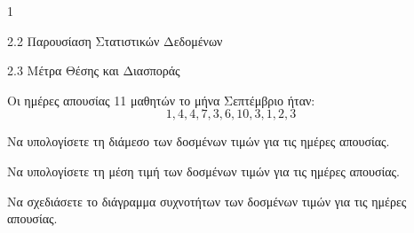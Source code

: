\begin{ylh}{1}
    \item 2.2 Παρουσίαση Στατιστικών Δεδομένων
    \item 2.3 Μέτρα Θέσης και Διασποράς
\end{ylh}
Οι ημέρες απουσίας 11 μαθητών το μήνα Σεπτέμβριο ήταν:
\[ 1, 4, 4, 7, 3, 6, 10, 3, 1, 2, 3 \]
\begin{alist}
\item Να υπολογίσετε τη διάμεσο των δοσμένων τιμών για τις ημέρες απουσίας. 
\item Να υπολογίσετε τη μέση τιμή των δοσμένων τιμών για τις ημέρες απουσίας. 
\item Να σχεδιάσετε το διάγραμμα συχνοτήτων των δοσμένων τιμών για τις ημέρες απουσίας. 
\end{alist}

